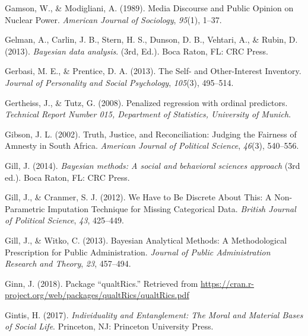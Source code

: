 \documentclass[12pt,econ]{sources/authesis}
\newenvironment{CSLReferences}%
  {}%
  {\par}
\begin{document}
\begin{CSLReferences}{1}{0}
\leavevmode{}%
Gamson, W., \& Modigliani, A. (1989). Media {Discourse} and {Public} {Opinion} on {Nuclear} {Power}. \emph{American Journal of Sociology}, \emph{95}(1), 1--37.

\leavevmode{}%
Gelman, A., Carlin, J. B., Stern, H. S., Dunson, D. B., Vehtari, A., \& Rubin, D. (2013). \emph{Bayesian data analysis}. (3rd, Ed.). Boca Raton, FL: CRC Press.

\leavevmode{}%
Gerbasi, M. E., \& Prentice, D. A. (2013). {The Self- and Other-Interest Inventory}. \emph{Journal of Personality and Social Psychology}, \emph{105}(3), 495--514.

\leavevmode{}%
Gertheiss, J., \& Tutz, G. (2008). Penalized regression with ordinal predictors. \emph{Technical Report Number 015, Department of Statistics, University of Munich}.

\leavevmode{}%
Gibson, J. L. (2002). {Truth, Justice, and Reconciliation: Judging the Fairness of Amnesty in South Africa}. \emph{American Journal of Political Science}, \emph{46}(3), 540--556.

\leavevmode{}%
Gill, J. (2014). \emph{Bayesian methods: A social and behavioral sciences approach} (3rd ed.). Boca Raton, FL: CRC Press.

\leavevmode{}%
Gill, J., \& Cranmer, S. J. (2012). {We Have to Be Discrete About This: A Non-Parametric Imputation Technique for Missing Categorical Data}. \emph{British Journal of Political Science}, \emph{43}, 425--449.

\leavevmode{}%
Gill, J., \& Witko, C. (2013). {Bayesian Analytical Methods: A Methodological Prescription for Public Administration}. \emph{Journal of Public Administration Research and Theory}, \emph{23}, 457--494.

\leavevmode{}%
Ginn, J. (2018). Package {``qualtRics.''} Retrieved from \url{https://cran.r-project.org/web/packages/qualtRics/qualtRics.pdf}

\leavevmode{}%
Gintis, H. (2017). \emph{{Individuality and Entanglement: The Moral and Material Bases of Social Life}}. Princeton, NJ: Princeton University Press.


\end{CSLReferences}
\end{document}
